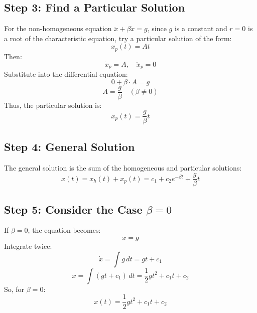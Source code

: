 \documentclass[a4paper,12pt]{article}
\begin{document}
\subsection*{Step 3: Find a Particular Solution}
For the non-homogeneous equation \(\ddot{x} + \beta \dot{x} = g\), since \(g\) is a constant and \(r = 0\) is a root of the characteristic equation, try a particular solution of the form:
\begin{equation}
x_p(t) = A t
\end{equation}
Then:
\[
\dot{x}_p = A, \quad \ddot{x}_p = 0
\]
Substitute into the differential equation:
\[
0 + \beta \cdot A = g
\]
\[
A = \frac{g}{\beta} \quad (\beta \neq 0)
\]
Thus, the particular solution is:
\begin{equation}
x_p(t) = \frac{g}{\beta} t
\end{equation}

\subsection*{Step 4: General Solution}
The general solution is the sum of the homogeneous and particular solutions:
\begin{equation}
x(t) = x_h(t) + x_p(t) = c_1 + c_2 e^{-\beta t} + \frac{g}{\beta} t
\end{equation}

\subsection*{Step 5: Consider the Case \(\beta = 0\)}
If \(\beta = 0\), the equation becomes:
\begin{equation}
\ddot{x} = g
\end{equation}
Integrate twice:
\[
\dot{x} = \int g \, dt = g t + c_1
\]
\[
x = \int (g t + c_1) \, dt = \frac{1}{2} g t^2 + c_1 t + c_2
\]
So, for \(\beta = 0\):
\begin{equation}
x(t) = \frac{1}{2} g t^2 + c_1 t + c_2
\end{equation}

\end{document}

